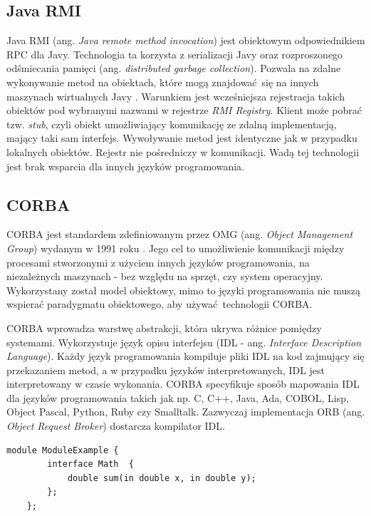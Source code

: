 \subsection{Java RMI}

Java RMI (ang. \textit{Java remote method invocation}) jest obiektowym odpowiednikiem RPC dla Javy. Technologia ta korzysta z serializacji Javy oraz rozproszonego odśmiecania pamięci (ang. \textit{distributed garbage collection}). Pozwala na zdalne wykonywanie metod na obiektach, które mogą znajdować się na innych maszynach wirtualnych Javy \cite{JAVA_RMI}. Warunkiem jest wcześniejsza rejestracja takich obiektów pod wybranymi nazwami w rejestrze \textit{RMI Registry}. Klient może pobrać tzw. \textit{stub}, czyli obiekt umożliwiający komunikację ze zdalną implementacją, mający taki sam interfejs. Wywoływanie metod jest identyczne jak w przypadku lokalnych obiektów. Rejestr nie pośredniczy w komunikacji. Wadą tej technologii jest brak wsparcia dla innych języków programowania.


\subsection{CORBA}

CORBA jest standardem zdefiniowanym przez OMG (ang. \textit{Object Management Group}) wydanym w 1991 roku \cite{CORBA}. Jego cel to umożliwienie komunikacji między procesami stworzonymi z użyciem innych języków programowania, na niezależnych maszynach - bez względu na sprzęt, czy system operacyjny. Wykorzystany został model obiektowy, mimo to języki programowania nie muszą wspierać paradygmatu obiektowego, aby używać technologii CORBA.

CORBA wprowadza warstwę abstrakcji, która ukrywa różnice pomiędzy systemami. Wykorzystuje język opisu interfejsu (IDL - ang. \textit{Interface Description Language}). Każdy język programowania kompiluje pliki IDL na kod zajmujący się przekazaniem metod, a w przypadku języków interpretowanych, IDL jest interpretowany w czasie wykonania. CORBA specyfikuje sposób mapowania IDL dla języków programowania takich jak np. C, C++, Java, Ada, COBOL, Lisp, Object Pascal, Python, Ruby czy Smalltalk. Zazwyczaj implementacja ORB (ang. \textit{Object Request Broker}) dostarcza kompilator IDL.


\begin{lstlisting}[caption={Przykład użycia IDL.},captionpos=b]
    module ModuleExample {
        interface Math  {
            double sum(in double x, in double y);
        };
    };
\end{lstlisting}


